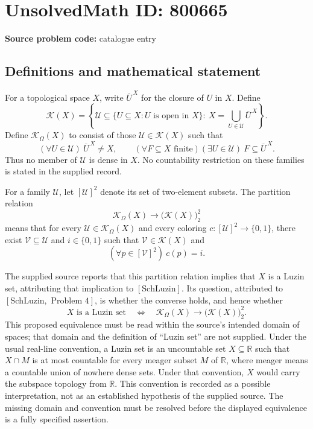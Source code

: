 \documentclass[11pt]{article}
\newcommand{\R}{\mathbb{R}}
\begin{document}
\section*{UnsolvedMath ID: 800665}
\textbf{Source problem code:} catalogue entry
\subsection{Definitions and mathematical statement}
For a topological space \(X\), write \(\overline{U}^{\,X}\) for the closure of \(U\) in \(X\). Define
\[
\mathcal K(X)=\left\{\mathcal U\subseteq\{U\subseteq X:U\text{ is open in }X\}:\ X=\bigcup_{U\in\mathcal U}\overline{U}^{\,X}\right\}.
\]
Define \(\mathcal K_\Omega(X)\) to consist of those \(\mathcal U\in\mathcal K(X)\) such that
\[
(\forall U\in\mathcal U)\ \overline{U}^{\,X}\ne X,
\qquad
(\forall F\subseteq X\text{ finite})(\exists U\in\mathcal U)\ F\subseteq\overline{U}^{\,X}.
\]
Thus no member of \(\mathcal U\) is dense in \(X\). No countability restriction on these families is stated in the supplied record.

For a family \(\mathcal U\), let \([\mathcal U]^2\) denote its set of two-element subsets. The partition relation
\[
\mathcal K_\Omega(X)\longrightarrow\bigl(\mathcal K(X)\bigr)^2_2
\]
means that for every \(\mathcal U\in\mathcal K_\Omega(X)\) and every coloring \(c:[\mathcal U]^2\to\{0,1\}\), there exist \(\mathcal V\subseteq\mathcal U\) and \(i\in\{0,1\}\) such that \(\mathcal V\in\mathcal K(X)\) and
\[
(\forall p\in[\mathcal V]^2)\ c(p)=i.
\]

The supplied source reports that this partition relation implies that \(X\) is a Luzin set, attributing that implication to \([\mathrm{SchLuzin}]\). Its question, attributed to \([\mathrm{SchLuzin},\text{ Problem }4]\), is whether the converse holds, and hence whether
\[
X\text{ is a Luzin set}
\quad\Longleftrightarrow\quad
\mathcal K_\Omega(X)\longrightarrow\bigl(\mathcal K(X)\bigr)^2_2.
\]
This proposed equivalence must be read within the source's intended domain of spaces; that domain and the definition of ``Luzin set'' are not supplied. Under the usual real-line convention, a Luzin set is an uncountable set \(X\subseteq\R\) such that \(X\cap M\) is at most countable for every meager subset \(M\) of \(\R\), where meager means a countable union of nowhere dense sets. Under that convention, \(X\) would carry the subspace topology from \(\R\). This convention is recorded as a possible interpretation, not as an established hypothesis of the supplied source. The missing domain and convention must be resolved before the displayed equivalence is a fully specified assertion.
\end{document}
